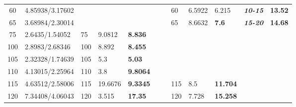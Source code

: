 \begin{table*}
{\begin{tabular}{|c|l|l|l|l|l|l|l|l|l|l|l}
60 & 4.85938/3.17602 & & & & & & 60 & 6.5922 & 6.215 & \textit{\textbf{10-15}} & \multicolumn{1}{l|}{\textbf{13.52}} \\ \cline{1-2} \cline{8-12}
65 & 3.68984/2.30014 & & & & & & 65 & 8.6632 & \textbf{7.6} & \textit{\textbf{15-20}} & \multicolumn{1}{l|}{\textbf{14.68}} \\ \cline{1-5} \cline{8-12}
75 & 2.6435/1.54052 & 75 & 9.0812 & \textbf{8.836} & & & & & &
  \multicolumn{2}{l|}{\multirow{3}{*}{}} \\ \cline{1-5}
100 & 2.8983/2.68346 & 100 & 8.892 & \textbf{8.455} & & & & & &
  \multicolumn{2}{l|}{\multirow{3}{*}{}} \\ \cline{1-5}
105 & 2.32328/1.74639 & 105 & 5.3 & \textbf{5.03} & & & & & &
  \multicolumn{2}{l|}{\multirow{3}{*}{}} \\ \cline{1-5}
110 & 4.13015/2.25964 & 110 & 3.8 & \textbf{9.8064} & & & & & &
  \multicolumn{2}{l|}{\multirow{3}{*}{}} \\ \cline{1-5} \cline{8-10}
115 & 4.63512/2.58006 & 115 & 19.6676 & \textbf{9.3345} & & & 115 & 8.5 &
  \textbf{11.704} & \multicolumn{2}{l|}{} \\ \cline{1-5} \cline{8-10}
120 & 7.34408/4.06043 & 120 & 3.515 & \textbf{17.35} & & & 120 & 7.728 &
  \textbf{15.258} & \multicolumn{2}{l|}{} \\ \cline{1-5} \cline{8-10}
\end{tabular}%
}
\end{table*}

